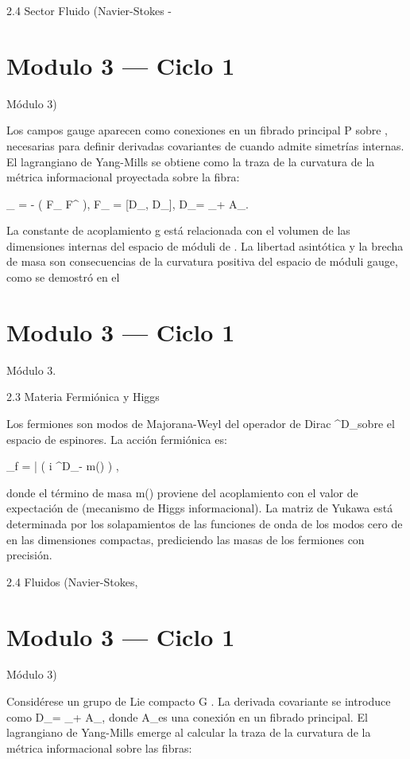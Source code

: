 \documentclass[12pt,twoside]{book}
\begin{document}
2.4 Sector Fluido (Navier-Stokes - 

\chapter{Modulo 3 — Ciclo 1}
Módulo 3)

Los campos gauge aparecen como conexiones en un fibrado principal  P  sobre   , necesarias para definir derivadas covariantes de  \rho  cuando    admite simetrías internas. El lagrangiano de Yang-Mills se obtiene como la traza de la curvatura de la métrica informacional proyectada sobre la fibra:

_{} = -  \left( F_{\mu\nu} F^{\mu\nu} \right), \quad F_{\mu\nu} = [D_\mu, D_\nu], \quad D_\mu = \nabla_\mu + A_\mu.

La constante de acoplamiento  g  está relacionada con el volumen de las dimensiones internas del espacio de móduli de  \rho . La libertad asintótica y la brecha de masa son consecuencias de la curvatura positiva del espacio de móduli gauge, como se demostró en el 

\chapter{Modulo 3 — Ciclo 1}
Módulo 3.

2.3 Materia Fermiónica y Higgs

Los fermiones son modos de Majorana-Weyl del operador de Dirac  \gamma^\mu D_\mu  sobre el espacio de espinores. La acción fermiónica es:

_{f} = \bar{\psi} \left( i \gamma^\mu D_\mu - m(\rho) \right) \psi,

donde el término de masa  m(\rho)  proviene del acoplamiento con el valor de expectación de  \rho  (mecanismo de Higgs informacional). La matriz de Yukawa está determinada por los solapamientos de las funciones de onda de los modos cero de  \rho  en las dimensiones compactas, prediciendo las masas de los fermiones con precisión.

2.4 Fluidos (Navier-Stokes, 

\chapter{Modulo 3 — Ciclo 1}
Módulo 3)

Considérese un grupo de Lie compacto  G . La derivada covariante se introduce como  D_\mu = \nabla_\mu + A_\mu , donde  A_\mu  es una conexión en un fibrado principal. El lagrangiano de Yang-Mills emerge al calcular la traza de la curvatura de la métrica informacional sobre las fibras:
\end{document}
